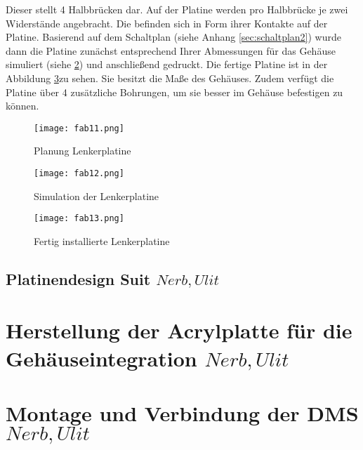 Dieser stellt 4 Halbbrücken dar.
Auf der Platine werden pro Halbbrücke je zwei Widerstände angebracht. Die befinden sich in Form ihrer Kontakte auf der Platine.
Basierend auf dem Schaltplan (siehe Anhang \ref{sec:schaltplan2}) wurde dann die Platine zunächst entsprechend Ihrer Abmessungen für das Gehäuse simuliert (siehe \ref{fig:fab12}) und anschließend gedruckt. Die fertige Platine ist in der Abbildung \ref{fig:fab13}zu sehen. Sie besitzt die Maße des Gehäuses. Zudem verfügt die Platine über 4 zusätzliche Bohrungen, um sie besser im Gehäuse befestigen zu können. 
\begin{figure}[h]
    \begin{center}
        \texttt{[image: fab11.png]}
        \caption[Planung Lenkerplatine (Abbildungsverzeichnis)]{Planung Lenkerplatine}
        \label{fig:fab11}
    \end{center}
\end{figure}

\begin{figure}[h]
    \begin{center}
        \texttt{[image: fab12.png]}
        \caption[Simulation der Lenkerplatine (Abbildungsverzeichnis)]{Simulation der Lenkerplatine}
        \label{fig:fab12}
    \end{center}
\end{figure}

\begin{figure}[h]
    \begin{center}
        \texttt{[image: fab13.png]}
        \caption[Fertig installierte Lenkerplatine (Abbildungsverzeichnis)]{Fertig installierte Lenkerplatine}
        \label{fig:fab13}
    \end{center}
\end{figure}





\newpage{}

\subsection{Platinendesign Suit \(Nerb, Ulit\)}
\section{Herstellung der Acrylplatte f\"ur die Geh\"auseintegration \(Nerb, Ulit\)}
\section{Montage und Verbindung der DMS \(Nerb, Ulit\)}
